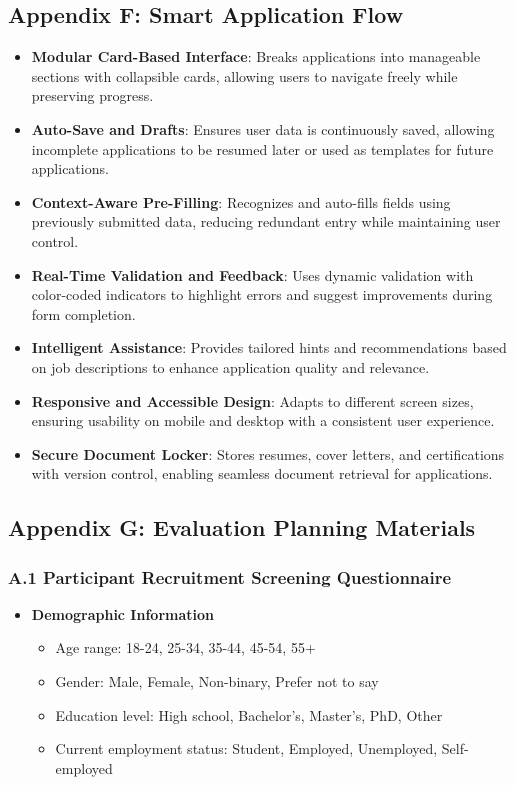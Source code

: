 \documentclass[
	letterpaper, %
]{jdf}
\begin{document}
\begin{sloppypar}
\subsection{Appendix F: Smart Application Flow}
\begin{itemize}
    \item \textbf{Modular Card-Based Interface}: Breaks applications into manageable sections with collapsible cards, allowing users to navigate freely while preserving progress.
    \item \textbf{Auto-Save and Drafts}: Ensures user data is continuously saved, allowing incomplete applications to be resumed later or used as templates for future applications.
    \item \textbf{Context-Aware Pre-Filling}: Recognizes and auto-fills fields using previously submitted data, reducing redundant entry while maintaining user control.
    \item \textbf{Real-Time Validation and Feedback}: Uses dynamic validation with color-coded indicators to highlight errors and suggest improvements during form completion.
    \item \textbf{Intelligent Assistance}: Provides tailored hints and recommendations based on job descriptions to enhance application quality and relevance.
    \item \textbf{Responsive and Accessible Design}: Adapts to different screen sizes, ensuring usability on mobile and desktop with a consistent user experience.
    \item \textbf{Secure Document Locker}: Stores resumes, cover letters, and certifications with version control, enabling seamless document retrieval for applications.
\end{itemize}

\subsection{Appendix G: Evaluation Planning Materials}

\subsubsection{A.1 Participant Recruitment Screening Questionnaire}

\begin{itemize}
    \item \textbf{Demographic Information}
    \begin{itemize}
        \item Age range: 18-24, 25-34, 35-44, 45-54, 55+
        \item Gender: Male, Female, Non-binary, Prefer not to say
        \item Education level: High school, Bachelor's, Master's, PhD, Other
        \item Current employment status: Student, Employed, Unemployed, Self-employed
    \end{itemize}
    

\end{itemize}
\end{sloppypar}
\end{document}
